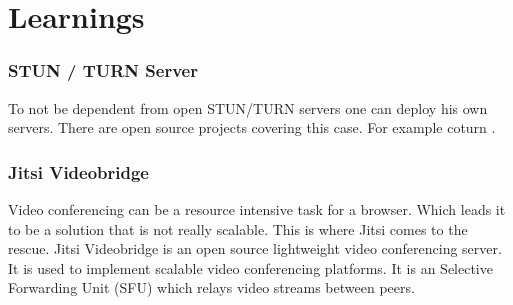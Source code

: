 \clearpage
\chapter{Learnings}

\subsection{STUN / TURN Server}
To not be dependent from open STUN/TURN servers one can deploy his own servers. There are open source projects covering this case. For example coturn \cite{coturn}.

\subsection{Jitsi Videobridge}
Video conferencing can be a resource intensive task for a browser. Which leads it to be a solution that is not really scalable. This is where Jitsi comes to the rescue. Jitsi Videobridge is an open source lightweight video conferencing server. It is used to implement scalable video conferencing platforms. It is an Selective Forwarding Unit (SFU) which relays video streams between peers.
